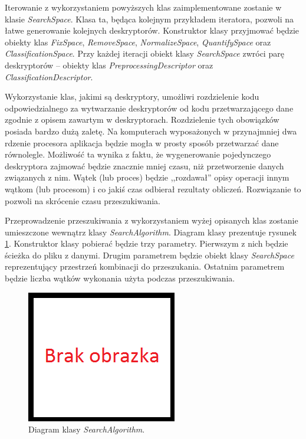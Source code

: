 \documentclass[../thesis.tex]{subfiles}
\begin{document}
Iterowanie z wykorzystaniem powyższych klas zaimplementowane zostanie w klasie \emph{SearchSpace}. Klasa ta, będąca kolejnym przykładem iteratora, pozwoli na łatwe generowanie kolejnych deskryptorów. Konstruktor klasy przyjmować będzie obiekty klas \emph{FixSpace}, \emph{RemoveSpace}, \emph{NormalizeSpace}, \emph{QuantifySpace} oraz \emph{ClassificationSpace}. Przy każdej iteracji obiekt klasy \emph{SearchSpace} zwróci parę deskryptorów -- obiekty klas \emph{PreprocessingDescriptor} oraz \emph{ClassificationDescriptor}.

Wykorzystanie klas, jakimi są deskryptory, umożliwi rozdzielenie kodu odpowiedzialnego za wytwarzanie deskryptorów od kodu przetwarzającego dane zgodnie z opisem zawartym w deskryptorach. Rozdzielenie tych obowiązków posiada bardzo dużą zaletę. Na komputerach wyposażonych w przynajmniej dwa rdzenie procesora aplikacja będzie mogła w prosty sposób przetwarzać dane równolegle. Możliwość ta wynika z faktu, że wygenerowanie pojedynczego deskryptora zajmować będzie znacznie mniej czasu, niż przetworzenie danych związanych z nim. Wątek (lub proces) będzie ,,rozdawał'' opisy operacji innym wątkom (lub procesom) i co jakiś czas odbierał rezultaty obliczeń. Rozwiązanie to pozwoli na skrócenie czasu przeszukiwania.

Przeprowadzenie przeszukiwania z wykorzystaniem wyżej opisanych klas zostanie umieszczone wewnątrz klasy \emph{SearchAlgorithm}. Diagram klasy prezentuje rysunek \ref{proj:diagram_searchalgorithm}. Konstruktor klasy pobierać będzie trzy parametry. Pierwszym z nich będzie ścieżka do pliku z danymi. Drugim parametrem będzie obiekt klasy \emph{SearchSpace} reprezentujący przestrzeń kombinacji do przeszukania. Ostatnim parametrem będzie liczba wątków wykonania użyta podczas przeszukiwania.

\begin{figure}
\centering
\includegraphics{missing.png}
\caption{Diagram klasy \emph{SearchAlgorithm}.}
\label{proj:diagram_searchalgorithm}
\end{figure}
\end{document}

